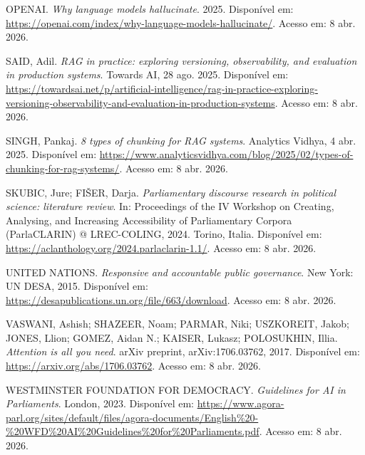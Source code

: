 OPENAI. \textit{Why language models hallucinate}. 2025. Disponível em: \url{https://openai.com/index/why-language-models-hallucinate/}. Acesso em: 8 abr. 2026.

SAID, Adil. \textit{RAG in practice: exploring versioning, observability, and evaluation in production systems}. Towards AI, 28 ago. 2025. Disponível em: \url{https://towardsai.net/p/artificial-intelligence/rag-in-practice-exploring-versioning-observability-and-evaluation-in-production-systems}. Acesso em: 8 abr. 2026.

SINGH, Pankaj. \textit{8 types of chunking for RAG systems}. Analytics Vidhya, 4 abr. 2025. Disponível em: \url{https://www.analyticsvidhya.com/blog/2025/02/types-of-chunking-for-rag-systems/}. Acesso em: 8 abr. 2026.

SKUBIC, Jure; FIŠER, Darja. \textit{Parliamentary discourse research in political science: literature review}. In: Proceedings of the IV Workshop on Creating, Analysing, and Increasing Accessibility of Parliamentary Corpora (ParlaCLARIN) @ LREC-COLING, 2024. Torino, Italia. Disponível em: \url{https://aclanthology.org/2024.parlaclarin-1.1/}. Acesso em: 8 abr. 2026.

UNITED NATIONS. \textit{Responsive and accountable public governance}. New York: UN DESA, 2015. Disponível em: \url{https://desapublications.un.org/file/663/download}. Acesso em: 8 abr. 2026.

VASWANI, Ashish; SHAZEER, Noam; PARMAR, Niki; USZKOREIT, Jakob; JONES, Llion; GOMEZ, Aidan N.; KAISER, Lukasz; POLOSUKHIN, Illia. \textit{Attention is all you need}. arXiv preprint, arXiv:1706.03762, 2017. Disponível em: \url{https://arxiv.org/abs/1706.03762}. Acesso em: 8 abr. 2026.

WESTMINSTER FOUNDATION FOR DEMOCRACY. \textit{Guidelines for AI in Parliaments}. London, 2023. Disponível em: \url{https://www.agora-parl.org/sites/default/files/agora-documents/English%20-%20WFD%20AI%20Guidelines%20for%20Parliaments.pdf}. Acesso em: 8 abr. 2026.

\normalsize
